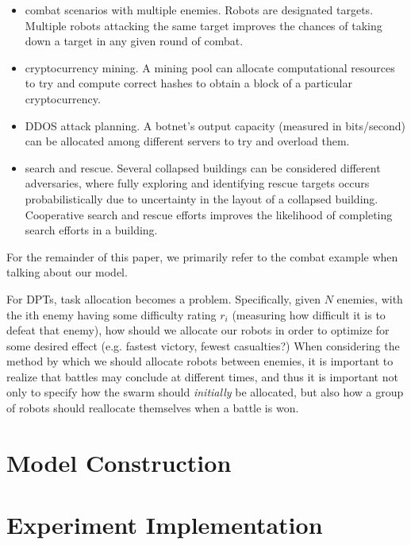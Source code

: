\documentclass[11pt]{article}
\theoremstyle{definition}
\begin{document}
\begin{itemize}
    \item combat scenarios with multiple enemies.
        Robots are designated targets. Multiple
        robots attacking the same target
        improves the chances of taking down
        a target in any given round of combat.
    \item cryptocurrency mining. A mining pool
        can allocate computational resources to
        try and compute correct hashes to
        obtain a block of a particular
        cryptocurrency.
    \item DDOS attack planning. A botnet's
        output capacity (measured in bits/second)
        can be allocated among different servers
        to try and overload them.
    \item search and rescue. Several collapsed
        buildings can be considered different
        adversaries, where fully exploring
        and identifying rescue targets occurs
        probabilistically due to uncertainty
        in the layout of a collapsed building.
        Cooperative search and rescue efforts improves
        the likelihood of completing search efforts
        in a building.
\end{itemize}

For the remainder of this paper, we primarily
refer to the combat example when talking about
our model.

For DPTs, task allocation becomes a problem.
Specifically, given $ N $ enemies,
with the ith enemy having some difficulty
rating $ r_i $ (measuring how difficult it is
to defeat that enemy), how should we allocate our robots
in order to optimize for some desired effect
(e.g. fastest victory, fewest casualties?)
When considering the method by which we should allocate
robots between enemies, it is important to realize
that battles may conclude at different times, and
thus it is important not only to specify how the
swarm should \emph{initially} be allocated,
but also how a group of robots should reallocate
themselves when a battle is won.

\section{Model Construction}

\section{Experiment Implementation}
\label{sec:implementation}
\end{document}
